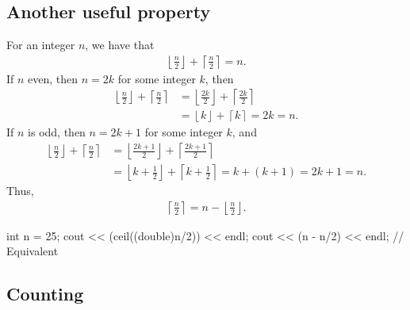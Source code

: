 \documentclass{report}
\begin{document}
    \subsection{Another useful property}
    \bigbreak \noindent 
    For an integer $n$, we have that
    \begin{align*}
        \left\lfloor \frac{n}{2} \right\rfloor + \left\lceil \frac{n}{2} \right\rceil = n
    .\end{align*}
    \bigbreak \noindent 
    If $n$ even, then $n = 2k$ for some integer $k$, then
    \begin{align*}
        \left\lfloor \frac{n}{2} \right\rfloor + \left\lceil \frac{n}{2} \right\rceil &= \left\lfloor \frac{2k}{2} \right\rfloor + \left\lceil \frac{2k}{2} \right\rceil \\
        &= \left\lfloor k \right\rfloor + \left\lceil k \right\rceil = 2k = n
    .\end{align*}
    If $n$ is odd, then $ n = 2k+1$ for some integer $k$, and 
    \begin{align*}
        \left\lfloor \frac{n}{2} \right\rfloor + \left\lceil \frac{n}{2} \right\rceil &= \left\lfloor \frac{2k+1}{2} \right\rfloor + \left\lceil \frac{2k+1}{2} \right\rceil \\
                                                                                      &= \left\lfloor k + \frac{1}{2} \right\rfloor + \left\lceil k + \frac{1}{2} \right\rceil = k + (k+1) = 2k + 1  =n
    .\end{align*}
    Thus, 
    \begin{align*}
        \left\lceil \frac{n}{2} \right\rceil = n - \left\lfloor \frac{n}{2} \right\rfloor
    .\end{align*}
    \bigbreak \noindent 
    \begin{cppcode}
    int n = 25;
    cout << (ceil((double)n/2)) << endl;
    cout << (n - n/2) << endl; // Equivalent
    \end{cppcode}


    \pagebreak 
    \subsection{Counting}
    \bigbreak \noindent 
\end{document}
